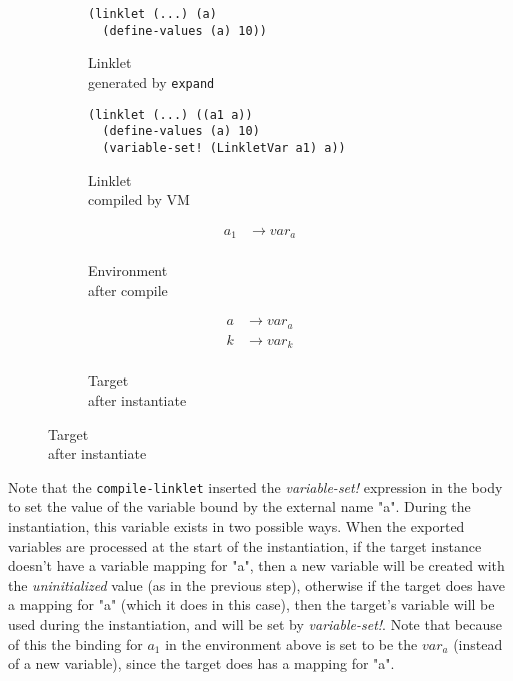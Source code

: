 \begin{figure}[h!]
  \small
  \begin{subfigure}[b]{0.26\textwidth}
    \begin{mdframed}
\begin{verbatim}
(linklet (...) (a)
  (define-values (a) 10))
\end{verbatim}
    \end{mdframed}
    \caption{Linklet \\ generated by \texttt{expand}}
    \label{fig:1}
  \end{subfigure}
  \begin{subfigure}[b]{0.38\textwidth}
    \begin{mdframed}
\begin{verbatim}
(linklet (...) ((a1 a))
  (define-values (a) 10)
  (variable-set! (LinkletVar a1) a))
\end{verbatim}
    \end{mdframed}
    \caption{Linklet \\ compiled by VM}
    \label{fig:2}
  \end{subfigure} \hfill
  \begin{subfigure}[b]{0.15\textwidth}
    \begin{mdframed}
      \begin{align*}
        a_1 &\rightarrow var_a \\
      \end{align*}
    \end{mdframed}
    \caption{Environment \\ after compile}
    \label{fig:2}
  \end{subfigure}
  \begin{subfigure}[b]{0.15\textwidth}
    \begin{mdframed}
      \begin{align*}
        a &\rightarrow var_a \\
        k &\rightarrow var_k \\
      \end{align*}
    \end{mdframed}
    \caption{Target \\ after instantiate}
    \label{fig:2}
  \end{subfigure}
\end{figure}

Note that the \verb|compile-linklet| inserted the \emph{variable-set!}
expression in the body to set the value of the variable bound by the
external name "a". During the instantiation, this variable exists in
two possible ways. When the exported variables are processed at the
start of the instantiation, if the target instance doesn't have a
variable mapping for "a", then a new variable will be created with the
\emph{uninitialized} value (as in the previous step), otherwise if the
target does have a mapping for "a" (which it does in this case), then
the target's variable will be used during the instantiation, and will
be set by \emph{variable-set!}. Note that because of this the binding
for $a_1$ in the environment above is set to be the $var_a$ (instead
of a new variable), since the target does has a mapping for "a".

